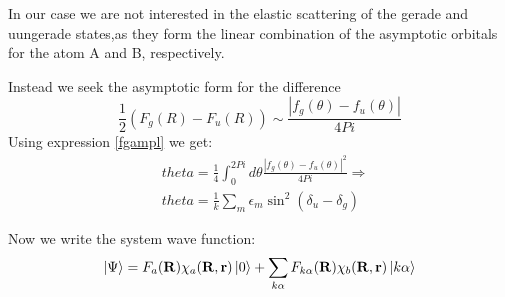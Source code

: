 In our case we are not interested in the elastic scattering of the gerade and uungerade states,as they form the linear combination of the asymptotic orbitals for the atom A and B, respectively.

Instead we seek the asymptotic form for the difference
\begin{equation}
  \frac{1}{2}\left(F_g(R) - F_u(R)\right) \sim \frac{\left|f_g(\theta) - f_u(\theta)\right|}{4Pi}
\end{equation}
Using expression \eqref{fgampl} we get:
\begin{equation}
\begin{split}
  & theta = \frac{1}{4}\int_{0}^{2Pi}d\theta\frac{\left|f_g(\theta) - f_u(\theta)\right|^2}{4Pi} \Rightarrow \\ 
  &  theta = \frac{1}{k}\sum_{m}\epsilon_m\sin^2(\delta_u-\delta_g)
\end{split}
\end{equation}

Now we write the system wave function:
\begin{equation}\label{ansatzWave1}
\Ket{\Psi} = F_a(\mathbf{R})\chi_a(\mathbf{R},\mathbf{r})\Ket{0} + \sum_{k\alpha}{F_{k\alpha}(\mathbf{R})\chi_b(\mathbf{R},\mathbf{r})\Ket{k\alpha}}
\end{equation}

